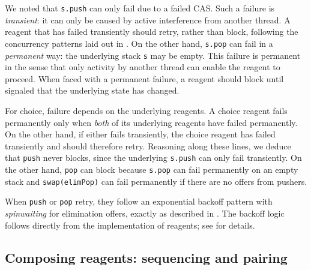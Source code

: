 \documentclass[preprint,nocopyrightspace]{sigplanconf}
\begin{document}
We noted that \lstinline{s.push} can only fail due to a failed CAS.
Such a failure is \emph{transient}: it can only be caused by active
interference from another thread.  A reagent that has failed
transiently should retry, rather than block, following the concurrency
patterns laid out in .  On the other hand,
\lstinline{s.pop} can fail in a \emph{permanent} way: the underlying
stack \lstinline{s} may be empty.  This failure is permanent in the
sense that only activity by another thread can enable the reagent to
proceed.  When faced with a permanent failure, a reagent should block
until signaled that the underlying state has changed.

For choice, failure depends on the underlying reagents.  A choice
reagent fails permanently only when \emph{both} of its underlying
reagents have failed permanently.  On the other hand, if either fails
transiently, the choice reagent has failed transiently and should
therefore retry.  Reasoning along these lines, we deduce that
\lstinline{push} never blocks, since the underlying \lstinline{s.push}
can only fail transiently.  On the other hand, \lstinline{pop} can
block because \lstinline{s.pop} can fail permanently on an empty stack
and \lstinline{swap(elimPop)} can fail permanently if there are no
offers from pushers.

When \lstinline{push} or \lstinline{pop} retry, they follow an
exponential backoff pattern with \emph{spinwaiting} for elimination
offers, exactly as described in .  The backoff
logic follows directly from the implementation of reagents; see
 for details.



\subsection{Composing reagents: sequencing and pairing}
\label{sec:conjunction}
\end{document}
